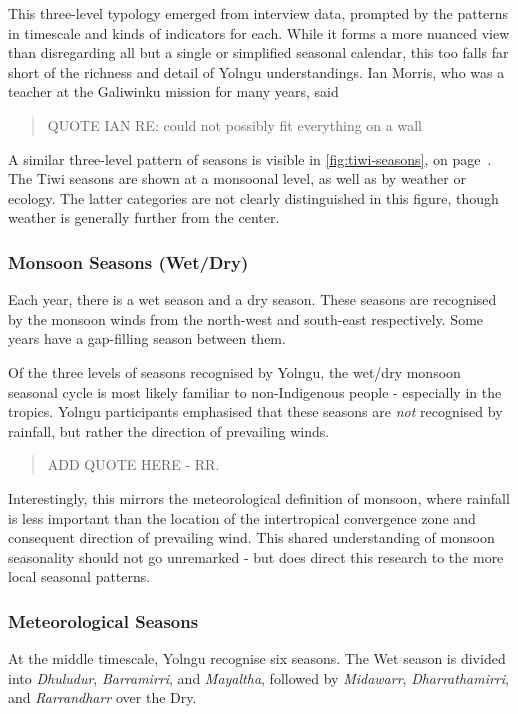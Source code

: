 This three-level typology emerged from interview data, prompted by
the patterns in timescale and kinds of indicators for each.
While it forms a more nuanced view than disregarding all but a single or
simplified seasonal calendar, this too falls far short of the richness
and detail of Yolngu understandings.
%
Ian Morris, who was a teacher at the Galiwinku mission for many years,
said \blockquote{
    QUOTE IAN RE: could not possibly fit everything on a wall
}

A similar three-level pattern of seasons is visible in \autoref{fig:tiwi-seasons},
on page~\pageref{fig:tiwi-seasons}.  The Tiwi seasons are shown at a monsoonal level,
as well as by weather or ecology.  The latter categories are not clearly distinguished
in this figure, though weather is generally further from the center.


\subsubsection{Monsoon Seasons (Wet/Dry)}

Each year, there is a wet season and a dry season.  These seasons are
recognised by the monsoon winds from the north-west and south-east
respectively.  Some years have a gap-filling season between them.

Of the three levels of seasons recognised by Yolngu,
the wet/dry monsoon seasonal cycle is most likely familiar to non-Indigenous people -
especially in the tropics.  Yolngu participants emphasised that these seasons
are \emph{not} recognised by rainfall, but rather the direction of prevailing winds.

\blockquote{
    ADD QUOTE HERE - RR.
}

Interestingly, this mirrors the meteorological definition of monsoon,
where rainfall is less important than the location of the intertropical
convergence zone and consequent direction of prevailing wind.
This shared understanding of monsoon seasonality should not go unremarked -
but does direct this research to the more local seasonal patterns.


\subsubsection{Meteorological Seasons}

At the middle timescale, Yolngu recognise six seasons.
The Wet season is divided into \textit{Dhuludur}, \textit{Barramirri},
and \textit{Mayaltha}, followed by \textit{Midawarr}, \textit{Dharrathamirri},
and \textit{Rarrandharr} over the Dry.

